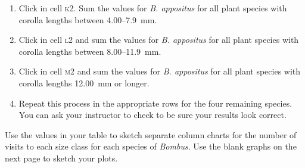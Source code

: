 \documentclass[12pt, hidelinks]{exam}
\begin{document}
\begin{questions}
\begin{enumerate}
	\item Click in cell \textsc{k}2. Sum the values for \textit{B. appositus} for
	all plant species with corolla lengths between 4.00–7.9~mm. 
	
	\item Click in cell \textsc{l}2 and sum the values for \textit{B. appositus} for
	all plant species with corolla lengths between 8.00–11.9~mm.
	
	\item Click in cell \textsc{m}2 and sum the values for \textit{B. appositus} for
	all plant species with corolla lengths 12.00~mm or longer.
	
	\item Repeat this process in the appropriate rows for the four remaining species. You can ask your instructor to check to be sure your results look correct. 
	
\end{enumerate}

\question
Use the values in your table to sketch separate column charts for the number
of visits to each size class for each species of \textit{Bombus}. Use the
blank graphs on the next page to sketch your plots.

\newpage


\end{questions}
\end{document}
